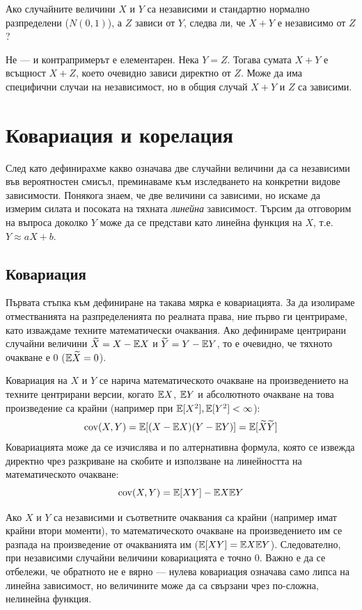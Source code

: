 \begin{remark}\label{rem:sum-dependence}
Ако случайните величини $X$ и $Y$ са независими и стандартно нормално разпределени ($N(0,1)$), а $Z$ зависи от $Y$, следва ли, че $X+Y$ е независимо от $Z$?

Не — и контрапримерът е елементарен. Нека $Y = Z$. Тогава сумата $X+Y$ е всъщност $X+Z$, което очевидно зависи директно от $Z$. Може да има специфични случаи на независимост, но в общия случай $X+Y$ и $Z$ са зависими.
\end{remark}


\section{Ковариация и корелация}

След като дефинирахме какво означава две случайни величини да са независими във вероятностен смисъл, преминаваме към изследването на конкретни видове зависимости. Понякога знаем, че две величини са зависими, но искаме да измерим силата и посоката на тяхната \emph{линейна} зависимост. Търсим да отговорим на въпроса доколко $Y$ може да се представи като линейна функция на $X$, т.е. $Y \approx aX + b$.

\subsection{Ковариация}

Първата стъпка към дефиниране на такава мярка е ковариацията. За да изолираме отместванията на разпределенията по реалната права, ние първо ги центрираме, като изваждаме техните математически очаквания.
Ако дефинираме центрирани случайни величини $\widetilde{X} = X - \mathbb{E} X$ и $\widetilde{Y} = Y - \mathbb{E} Y$, то е очевидно, че тяхното очакване е 0 ($\mathbb{E}\widetilde{X} = 0$).

\begin{defn}
Ковариация на $X$ и $Y$ се нарича математическото очакване на произведението на техните
центрирани версии, когато $\mathbb{E} X$, $\mathbb{E} Y$ и абсолютното очакване на това произведение
са крайни (например при $\mathbb{E}[X^2],\mathbb{E}[Y^2]<\infty$):
\[
\operatorname{cov}(X, Y) = \mathbb{E}[(X - \mathbb{E} X)(Y - \mathbb{E} Y)] = \mathbb{E}[\widetilde{X}\widetilde{Y}]
\]
Ковариацията може да се изчислява и по алтернативна формула, която се извежда директно чрез разкриване на скобите и използване на линейността на математическото очакване:
\[
\operatorname{cov}(X, Y) = \mathbb{E}[XY] - \mathbb{E} X \mathbb{E} Y
\]
\end{defn}
\begin{cor}
Ако $X$ и $Y$ са независими и съответните очаквания са крайни (например имат крайни
втори моменти), то математическото очакване на произведението им се разпада на
произведение от очакванията им ($\mathbb{E}[XY] = \mathbb{E} X\mathbb{E} Y$). Следователно, при независими
случайни величини ковариацията е точно 0. Важно е да се отбележи, че обратното не е
вярно — нулева ковариация означава само липса на линейна зависимост, но величините
може да са свързани чрез по-сложна, нелинейна функция.
\end{cor}

